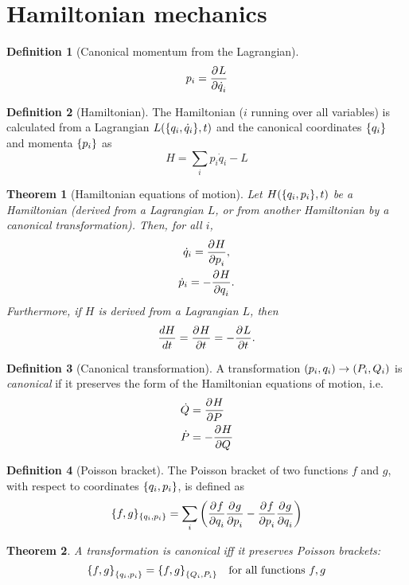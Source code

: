 \documentclass[]{article}
\newtheorem{theorem}{Theorem}
\theoremstyle{definition}
\newtheorem{definition}{Definition}
\begin{document}
\section{Hamiltonian mechanics}
\begin{definition}
	[Canonical momentum from the Lagrangian]
\begin{equation*}
	p_i = \frac{\partial^{} L}{\partial \dot q_i ^{}}
\end{equation*}
\end{definition}
\begin{definition}[Hamiltonian]
	The Hamiltonian ($i$ running over all variables) is calculated from a Lagrangian $L(\qty{q_i, \dot q_i}, t)$ and the canonical coordinates $\qty{q_i}$ and momenta $\qty{p_i}$ as
\begin{equation*}
	H = \sum_i p_i \dot q_i - L
\end{equation*}
\end{definition}
\begin{theorem}[Hamiltonian equations of motion]
	Let $H(\qty{q_i, p_i}, t)$ be a Hamiltonian (derived from a Lagrangian $L$, or from another Hamiltonian by a canonical transformation). Then, for all $i$,
\begin{gather*}
	\dot q_i = \frac{\partial^{} H}{\partial p_i ^{}},\\
	\dot p_i = -\frac{\partial^{} H}{\partial q_i ^{}}.
\end{gather*}
Furthermore, if $H$ is derived from a Lagrangian $L$, then
\begin{equation*}
	\frac{dH}{dt} = \frac{\partial^{} H}{\partial t ^{}} = -\frac{\partial^{} L}{\partial t ^{}}.
\end{equation*}

\end{theorem}
\begin{definition}[Canonical transformation]
	A transformation $({p_i, q_i}) \rightarrow (P_i, Q_i)$ is \emph{canonical} if it preserves the form of the Hamiltonian equations of motion, i.e.
\begin{align*}
	\dot Q &= \frac{\partial^{} H}{\partial P ^{}} \\
	\dot P &= -\frac{\partial^{} H}{\partial Q ^{}}
\end{align*}
\end{definition}
\begin{definition}[Poisson bracket]
	The Poisson bracket of two functions $f$ and $g$, with respect to coordinates $\qty{q_i,p_i}$, is defined as
\begin{equation*}
	\{f,g\}_\qty{q_i,p_i} = \sum_i \qty(\frac{\partial^{} f}{\partial q_i ^{}} \frac{\partial^{} g}{\partial p_i ^{}} - \frac{\partial^{} f}{\partial p_i ^{}} \frac{\partial^{} g}{\partial q_i ^{}})
\end{equation*}
\end{definition}
\begin{theorem}
	A transformation is canonical iff it preserves Poisson brackets:
	\begin{equation*}
		\qty{f,g}_\qty{q_i,p_i} = \qty{f,g}_\qty{Q_i,P_i} \quad \text{for all functions $f, g$}
	\end{equation*}
\end{theorem} 
\end{document}
